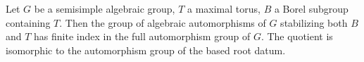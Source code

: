 Let $G$ be a semisimple algebraic group, $T$ a maximal torus, $B$ a Borel subgroup containing $T$. Then the group of algebraic automorphisms of $G$ stabilizing both $B$ and $T$ has finite index in the full automorphism group of $G$. The quotient is isomorphic to the automorphism group of the based root datum.
